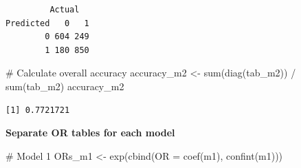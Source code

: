 \documentclass[
  letterpaper,
  DIV=11,
  numbers=noendperiod]{scrartcl}
\newenvironment{Shaded}{\begin{snugshade}}{\end{snugshade}}
\newcommand{\AttributeTok}[1]{\textcolor[rgb]{0.40,0.45,0.13}{#1}}
\newcommand{\CommentTok}[1]{\textcolor[rgb]{0.37,0.37,0.37}{#1}}
\newcommand{\DecValTok}[1]{\textcolor[rgb]{0.68,0.00,0.00}{#1}}
\newcommand{\FloatTok}[1]{\textcolor[rgb]{0.68,0.00,0.00}{#1}}
\newcommand{\FunctionTok}[1]{\textcolor[rgb]{0.28,0.35,0.67}{#1}}
\newcommand{\NormalTok}[1]{\textcolor[rgb]{0.00,0.23,0.31}{#1}}
\newcommand{\OtherTok}[1]{\textcolor[rgb]{0.00,0.23,0.31}{#1}}
\newcommand{\SpecialCharTok}[1]{\textcolor[rgb]{0.37,0.37,0.37}{#1}}
\newcommand{\StringTok}[1]{\textcolor[rgb]{0.13,0.47,0.30}{#1}}
\begin{document}
\begin{Shaded}
\end{Shaded}

\begin{verbatim}
         Actual
Predicted   0   1
        0 604 249
        1 180 850
\end{verbatim}

\begin{Shaded}
\begin{Highlighting}[]
\CommentTok{\# Calculate overall accuracy}
\NormalTok{accuracy\_m2 }\OtherTok{\textless{}{-}} \FunctionTok{sum}\NormalTok{(}\FunctionTok{diag}\NormalTok{(tab\_m2)) }\SpecialCharTok{/} \FunctionTok{sum}\NormalTok{(tab\_m2)}
\NormalTok{accuracy\_m2}
\end{Highlighting}
\end{Shaded}

\begin{verbatim}
[1] 0.7721721
\end{verbatim}

\textbf{Separate OR tables for each model}

\begin{Shaded}
\begin{Highlighting}[]
\CommentTok{\# Model 1}
\NormalTok{ORs\_m1 }\OtherTok{\textless{}{-}} \FunctionTok{exp}\NormalTok{(}\FunctionTok{cbind}\NormalTok{(}\AttributeTok{OR =} \FunctionTok{coef}\NormalTok{(m1), }\FunctionTok{confint}\NormalTok{(m1)))}
\end{Highlighting}
\end{Shaded}
\end{document}

